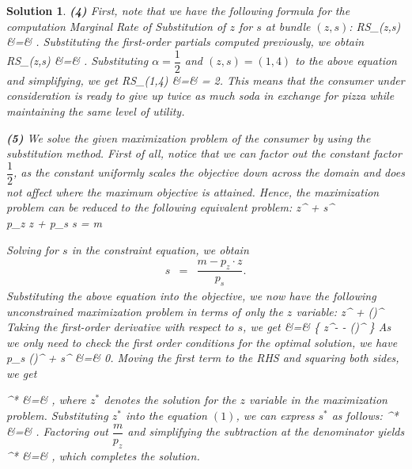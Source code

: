\documentclass{article} %
\def\eQb#1\eQe{\begin{eqnarray*}#1\end{eqnarray*}}
\theoremstyle{quest}
\newtheorem*{solution}{Solution}
\begin{document}
\begin{solution}
\smallskip

\textbf{(4)}
First, note that we have the following formula for the 
computation Marginal Rate of Substitution of $z$ for $s$ at bundle $(z,s)$:
\eQb
MRS_{}(z,s) &=& .
\eQe
Substituting the first-order partials computed previously, we obtain
\eQb
MRS_{}(z,s) &=& .
\eQe
Substituting $\alpha = \dfrac{1}{2}$ and $(z,s) = (1,4)$ to the above equation and simplifying, we get
\eQb
MRS_{}(1,4) &=&  = 2.
\eQe
This means that the consumer under consideration is ready to give up twice as much soda 
in exchange for pizza while maintaining the same level of utility.

\pagebreak

\textbf{(5)}
We solve the given maximization problem of the consumer by using the substitution method.
First of all, notice that we can factor out the constant factor $\dfrac{1}{2}$, as the constant
uniformly scales the objective down across the domain 
and does not affect where the maximum objective is attained.
Hence, the maximization problem
can be reduced to the following equivalent problem:
\eQb
\underset{ \{ z , s \} }{\text{max}} \> z^{} + s^{} \\
 \> \text{ : } \> p_z \cdot z + p_s \cdot s = m
\eQe

Solving for $s$ in the constraint equation, we obtain
\begin{eqnarray}
s &=& \dfrac{m - p_z \cdot z }{p_s}.
\end{eqnarray}
Substituting the above equation into the objective, we now have the following
unconstrained maximization problem in terms of only the $z$ variable:
\eQb
\underset{ \{ z \} }{\text{max}} \> 
z^{} + ()^{}  
\eQe
Taking the first-order derivative with respect to $s$, we get
\eQb
\dfrac{\partial U}{\partial z} &=& 
\{ z^{-} -  \cdot ()^{} \}
\eQe
As we only need to check the first order conditions
for the optimal solution, we have
\eQb
-p_s \cdot ()^{} + s^{} &=& 0. 
\eQe
Moving the first term to the RHS and squaring both sides, we get

\eQb
z^* &=& 
 \cdot {},
\eQe
where $z^*$ denotes the solution for the $z$ variable in the maximization problem.
Substituting $z^*$ into the equation $(1)$, we can express $s^*$ as follows: 
\eQb
s^* &=& .
\eQe
Factoring out $\dfrac{m}{p_z}$ and simplifying the subtraction at the denominator yields
\eQb
s^* &=&  \cdot {},
\eQe
which completes the solution.


\end{solution}
\end{document}
